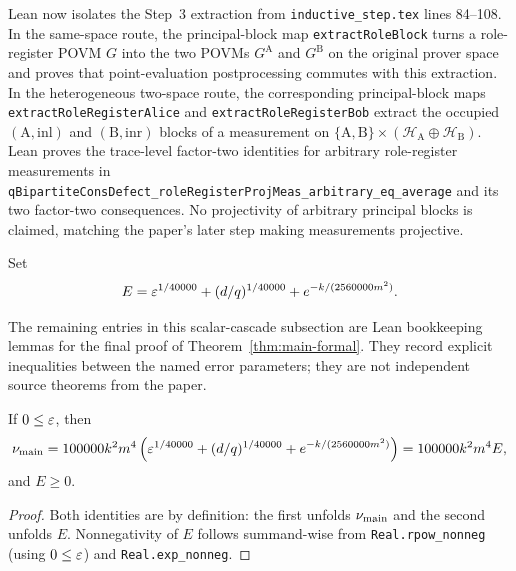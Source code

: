 \begin{remark}\label{rem:main-formal-unsymmetrization-consistency}
	Lean now isolates the Step~3 extraction from \texttt{inductive\_step.tex}
	lines 84--108.  In the same-space route, the principal-block map
	\texttt{extractRoleBlock} turns a role-register POVM \(G\) into the two POVMs
	\(G^{\mathrm A}\) and \(G^{\mathrm B}\) on the original prover space and
	proves that point-evaluation postprocessing commutes with this extraction.
	In the heterogeneous two-space route, the corresponding principal-block maps
	\texttt{extractRoleRegisterAlice} and \texttt{extractRoleRegisterBob}
	extract the occupied \((\mathrm A,\mathrm{inl})\) and
	\((\mathrm B,\mathrm{inr})\) blocks of a measurement on
	\(\{\mathrm A,\mathrm B\}\times(\mathcal H_{\mathrm A}\oplus\mathcal H_{\mathrm B})\).
	Lean proves the trace-level factor-two identities for arbitrary
	role-register measurements in
	\texttt{qBipartiteConsDefect\_roleRegisterProjMeas\_arbitrary\_eq\_average}
	and its two factor-two consequences.  No projectivity of arbitrary principal
	blocks is claimed, matching the paper's later step making measurements
	projective.
\end{remark}

\begin{definition}\label{def:main-formal-envelope}
	\leanok
	Set
	\[
		E = \varepsilon^{1/40000} + (d/q)^{1/40000} + e^{-k/(2560000m^2)}.
	\]
\end{definition}

The remaining entries in this scalar-cascade subsection are Lean bookkeeping
lemmas for the final proof of Theorem~\ref{thm:main-formal}.  They record
explicit inequalities between the named error parameters; they are not
independent source theorems from the paper.

\begin{theorem}\label{thm:main-formal-envelope-basics}
	\leanok
	If $0 \le \varepsilon$, then
	\[
		\nu_{\mathrm{main}}
		= 100000k^2m^4\left(\varepsilon^{1/40000} + (d/q)^{1/40000} + e^{-k/(2560000m^2)}\right)
		= 100000k^2m^4 E,
	\]
	and $E \ge 0$.
\end{theorem}
\begin{proof}
	\leanok
	Both identities are by definition: the first unfolds $\nu_{\mathrm{main}}$ and the second unfolds $E$. Nonnegativity of $E$ follows summand-wise from \texttt{Real.rpow\_nonneg} (using $0 \le \varepsilon$) and \texttt{Real.exp\_nonneg}.
\end{proof}

